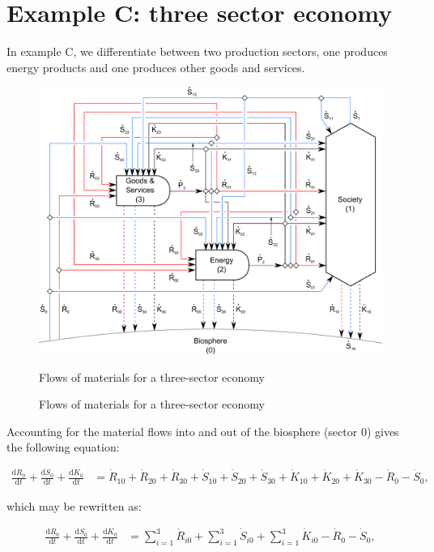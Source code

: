 \newpage
\section{Example C: three sector economy}
\label{sec:C_materials}

In example C, we differentiate between two production sectors, one produces energy products and one produces other goods and services.

\begin{figure}[h!]
\centering
\includegraphics[width=0.8\linewidth]{Part_1/Chapter_Materials/images/3_sector_materials.pdf}
\caption{Flows of materials for a three-sector economy}{Flows of materials for a three-sector economy}
\label{fig:C_materials}
\end{figure}

Accounting for the material flows into and out of the biosphere (sector 0) gives the following equation:

\begin{align} \label{eq:C_CV_0}
	\frac{\mathrm{d}R_{0}}{\mathrm{d}t} 
	+ \frac{\mathrm{d}S_{0}}{\mathrm{d}t}	
	+ \frac{\mathrm{d}K_0}{\mathrm{d}t}		
	& =  \dot{R}_{10} + \dot{R}_{20} + \dot{R}_{30}
	+ \dot{S}_{10} + \dot{S}_{20} + \dot{S}_{30}
	+ \dot{K}_{10} + \dot{K}_{20} + \dot{K}_{30}
	- \dot{R}_{0} 
	- \dot{S}_{0},
\end{align}

\noindent which may be rewritten as:

\begin{align} \label{eq:C_CV_0_b}
	\frac{\mathrm{d}R_{0}}{\mathrm{d}t} 
	+ \frac{\mathrm{d}S_{0}}{\mathrm{d}t}	
	+ \frac{\mathrm{d}K_0}{\mathrm{d}t}		
	& =  \sum_{i = 1}^{3}\dot{R}_{i0}
	+ \sum_{i = 1}^{3}\dot{S}_{i0}
	+ \sum_{i = 1}^{3}\dot{K}_{i0}
	- \dot{R}_{0} 
	- \dot{S}_{0},
\end{align}

